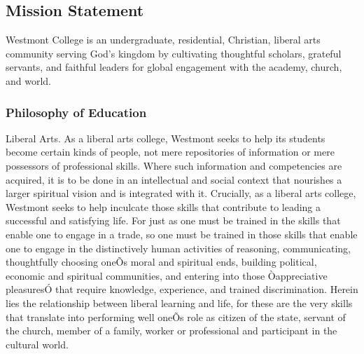 \documentclass[letterpaper, 11pt]{article}
\begin{document}
\subsection{Mission Statement}
   Westmont College is an undergraduate, residential, Christian, liberal arts community serving God's kingdom by cultivating thoughtful scholars, grateful servants, and faithful leaders for global engagement with the academy, church, and world.
\subsubsection{Philosophy of Education}
   Liberal Arts.  As a liberal arts college, Westmont seeks to help its students become certain kinds of people, not mere repositories of information or mere possessors of professional skills.  Where such information and competencies are acquired, it is to be done in an intellectual and social context that nourishes a larger spiritual vision and is integrated with it.  Crucially, as a liberal arts college, Westmont seeks to help inculcate those skills that contribute to leading a successful and satisfying life.  For just as one must be trained in the skills that enable one to engage in a trade, so one must be trained in those skills that enable one to engage in the distinctively human activities of reasoning, communicating, thoughtfully choosing oneÕs moral and spiritual ends, building political, economic and spiritual communities, and entering into those Òappreciative pleasuresÓ that require knowledge, experience, and trained discrimination. Herein lies the relationship between liberal learning and life, for these are the very skills that translate into performing well oneÕs role as citizen of the state, servant of the church, member of a family, worker or professional and participant in the cultural world.
\end{document}
